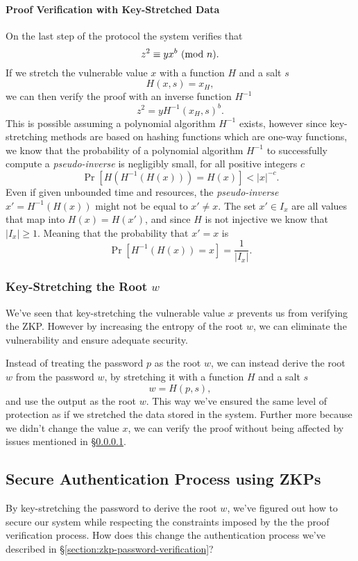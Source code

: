 \paragraph{Proof Verification with Key-Stretched Data}
\label{paragraph:problems-with-key-stretch}
On the last step of the protocol the system verifies that
$$ z^2 \equiv yx^b \ (\mathrm{mod}\ n).$$
If we stretch the vulnerable value $x$ with a function $H$ and a salt $s$
$$H(x, s) = x_H,$$
we can then verify the proof with an inverse function $H^{-1}$
$$z^2 = yH^{-1}(x_H, s)^b.$$
This is possible assuming a polynomial algorithm $H^{-1}$ exists, however since key-stretching methods are based on hashing functions which are one-way functions, we know that the probability of a polynomial algorithm $H^{-1}$ to successfully compute a \textit{pseudo-inverse} is negligibly small, for all positive integers $c$ \cite{goldreich2007foundations}
$$\Pr[H(H^{-1}(H(x))) = H(x)] < |x|^{-c}.$$
Even if given unbounded time and resources, the \textit{pseudo-inverse} $x' = H^{-1}(H(x))$ might not be equal to $x' \not = x$. 
The set $x'\in I_x$ are all values that map into $H(x) = H(x')$, and since $H$ is not injective we know that $|I_x| \ge 1$.
Meaning that the probability that $x' = x$ is
\medskip
$$\Pr[H^{-1}(H(x)) = x] = \frac{1}{|I_x|}.$$

\subsubsection{Key-Stretching the Root $w$}
We've seen that key-stretching the vulnerable value $x$ prevents us from verifying the ZKP.
However by increasing the entropy of the root $w$, we can eliminate the vulnerability and ensure adequate security.

\bigskip
\noindent Instead of treating the password $p$ as the root $w$, we can instead derive the root $w$ from the password $w$, by stretching it with a function $H$ and a salt $s$
$$w = H(p, s),$$
and use the output as the root $w$.
This way we've ensured the same level of protection as if we stretched the data stored in the system.
Further more because we didn't change the value $x$, we can verify the proof without being affected by issues mentioned in \S\ref{paragraph:problems-with-key-stretch}.

\newpage
\subsection{Secure Authentication Process using ZKPs}
By key-stretching the password to derive the root $w$, we've figured out how to secure our system while respecting the constraints imposed by the the proof verification process.
How does this change the authentication process we've described in \S\ref{section:zkp-password-verification}?

